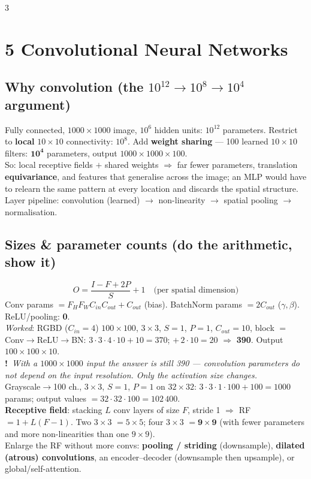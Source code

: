 \documentclass[9pt,a4paper,landscape]{extarticle}
\newcommand{\key}[1]{\textbf{#1}}
\newcommand{\tr}[1]{{\color{trap}\textbf{!}}\ \textit{#1}}
\begin{document}
\begin{multicols}{3}
\section{5 \; Convolutional Neural Networks}

\subsection{Why convolution (the $10^{12}\!\to\!10^{8}\!\to\!10^{4}$ argument)}
Fully connected, $1000\times1000$ image, $10^6$ hidden units: $10^{12}$ parameters. Restrict to \key{local} $10\times10$ connectivity: $10^{8}$. Add \key{weight sharing} --- 100 learned $10\times10$ filters: $\mathbf{10^4}$ parameters, output $1000\times1000\times100$.\\
So: local receptive fields $+$ shared weights $\Rightarrow$ far fewer parameters, translation \key{equivariance}, and features that generalise across the image; an MLP would have to relearn the same pattern at every location and discards the spatial structure.\\
Layer pipeline: convolution (learned) $\to$ non-linearity $\to$ spatial pooling $\to$ normalisation.

\subsection{Sizes \& parameter counts (do the arithmetic, show it)}
$$O=\frac{I-F+2P}{S}+1\quad\text{(per spatial dimension)}$$
Conv params $=F_H F_W C_{in}C_{out}+C_{out}$ (bias). BatchNorm params $=2C_{out}$ ($\gamma,\beta$). ReLU/pooling: \key{0}.\\
\emph{Worked}: RGBD ($C_{in}=4$) $100\times100$, $3\times3$, $S=1$, $P=1$, $C_{out}=10$, block $=$ Conv$\to$ReLU$\to$BN:
$3\cdot3\cdot4\cdot10+10=370$; $+\,2\cdot10=20$ $\Rightarrow$ \key{390}. Output $100\times100\times10$.\\
\tr{With a $1000\times1000$ input the answer is \emph{still 390} --- convolution parameters do not depend on the input resolution. Only the activation size changes.}\\
Grayscale$\to$100 ch., $3\times3$, $S{=}1$, $P{=}1$ on $32\times32$: $3\cdot3\cdot1\cdot100+100=1000$ params; output values $=32\cdot32\cdot100=102\,400$.\\
\key{Receptive field}: stacking $L$ conv layers of size $F$, stride 1 $\Rightarrow$ RF $=1+L(F-1)$. Two $3\times3$ $=5\times5$; four $3\times3$ $=\mathbf{9\times9}$ (with fewer parameters and more non-linearities than one $9\times9$).\\
Enlarge the RF without more convs: \key{pooling / striding} (downsample), \key{dilated (atrous) convolutions}, an encoder--decoder (downsample then upsample), or global/self-attention.


\end{multicols}
\end{document}
